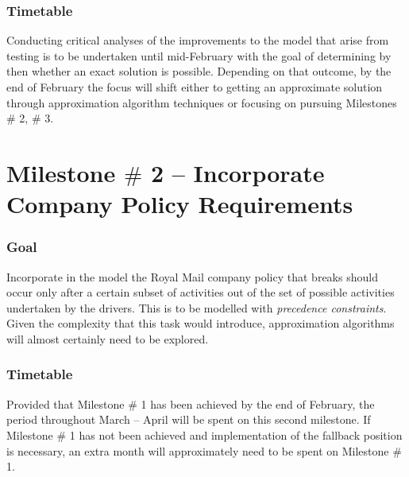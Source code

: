 \vspace{\baselineskip}
\subsubsection*{Timetable }

Conducting critical analyses of the improvements to the model that arise from testing is to be undertaken until mid-February with the goal of determining by then whether an exact solution is possible. Depending on that outcome, by the end of February the focus will shift either to getting an approximate solution through approximation algorithm techniques or focusing on pursuing Milestones $\#$ 2, $\#$ 3.



\vspace{\baselineskip}
\section{Milestone $\#$ 2 – Incorporate Company Policy Requirements}
\vspace{\baselineskip}
\subsubsection*{Goal}

Incorporate in the model the Royal Mail company policy that breaks should occur only after a certain subset of activities out of the set of possible activities undertaken by the drivers. This is to be modelled with \textit{precedence constraints}. Given the complexity that this task would introduce, approximation algorithms will almost certainly need to be explored.



\vspace{\baselineskip}
\subsubsection*{Timetable}

Provided that Milestone $\#$ 1 has been achieved by the end of February, the period throughout March – April will be spent on this second milestone. If Milestone $\#$ 1 has not been achieved and implementation of the fallback position is necessary, an extra month will approximately need to be spent on Milestone $\#$ 1.



